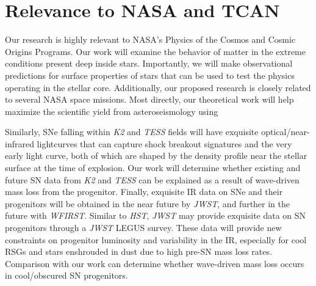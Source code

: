 {\color{orange}

\section{Relevance to NASA and TCAN}



Our research is highly relevant to NASA's Physics of the Cosmos and Cosmic Origins Programs. Our work will examine the behavior of matter in the extreme conditions present deep inside stars. Importantly, we will make observational predictions for surface properties of stars that can be used to test the physics operating in the stellar core. Additionally, our proposed research is closely related to several NASA space missions. Most directly, our theoretical work will help maximize the scientific yield from asteroseismology using 

Similarly, SNe falling within {\it K2} and {\it TESS} fields will have exquisite optical/near-infrared lightcurves that can capture shock breakout signatures and the very early light curve, both of which are shaped by the density profile near the stellar surface at the time of explosion. Our work will determine whether existing and future SN data from {\it K2} and {\it TESS} can be explained as a result of wave-driven mass loss from the progenitor. Finally, exquisite IR data on SNe and their progenitors will be obtained in the near future by {\it JWST}, and further in the future with {\it WFIRST}. Similar to {\it HST}, {\it JWST} may provide exquisite data on SN progenitors through a {\it JWST} LEGUS survey. These data will provide new constraints on progenitor luminosity and variability in the IR, especially for cool RSGs and stars enshrouded in dust due to high pre-SN mass loss rates. Comparison with our work can determine whether wave-driven mass loss occurs in cool/obscured SN progenitors.


}